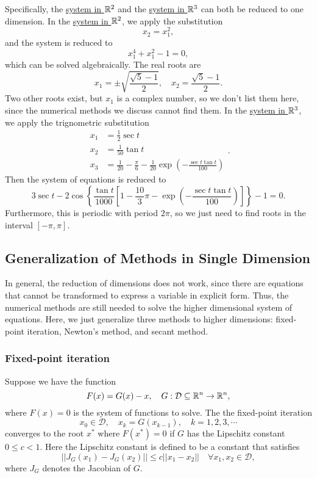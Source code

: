 \begin{table}[H]
Specifically, the \hyperref[eqn1]{system in \(\mathbb{R}^2\)} and the \hyperref[eqn3]{system in \(\mathbb{R}^3\)} can both be reduced to one dimension.
In the \hyperref[eqn1]{system in \(\mathbb{R}^2\)}, we apply the substitution
\[ x_2=x_1^2, \]
and the system is reduced to
\begin{equation}\label{eqn1reduce}
x_1^4+x_1^2-1=0,
\end{equation}
which can be solved algebraically.
The real roots are
\[ x_1=\pm\sqrt{\frac{\sqrt{5}-1}{2}}, \quad x_2=\frac{\sqrt{5}-1}{2}. \]
Two other roots exist, but \(x_1\) is a complex number, so we don't list them here, since the numerical methods we discuss cannot find them.
In the \hyperref[eqn2]{system in \(\mathbb{R}^3\)}, we apply the trignometric substitution
\[ \begin{aligned} x_1&=\frac{1}{2}\sec t \\ x_2&=\frac{1}{50}\tan t\\
x_3&=\frac{1}{20}-\frac{\pi}{6}-\frac{1}{20}\exp\left(-\frac{\sec t\tan t}{100} \right) \end{aligned}. \]
Then the system of equations is reduced to
\begin{equation}\label{eqn2reduce}
3\sec t-2\cos\left\{ \frac{\tan t}{1000} \left[ 1-\frac{10}{3}\pi-\exp\left(-\frac{\sec t\tan t}{100} \right) \right] \right\}-1=0. 
\end{equation}
Furthermore, this is periodic with period \(2\pi\), so we just need to find roots in the interval \([-\pi,\pi]\).

\subsection{Generalization of Methods in Single Dimension}
In general, the reduction of dimensions does not work, since there are equations that cannot be transformed to express a variable in explicit form.
Thus, the numerical methods are still needed to solve the higher dimensional system of equations.
Here, we just generalize three methods to higher dimensions: fixed-point iteration,	Newton's method, and secant method.



\subsubsection{Fixed-point iteration}
Suppose we have the function
\[ F(x)=G(x)-x, \quad G:\mathcal{D}\subseteq\mathbb{R}^{n}\to\mathbb{R}^n, \]
where \(F(x)=0\) is the system of functions to solve.
The the fixed-point iteration
\[ x_0\in\mathcal{D}, \quad x_{k}=G(x_{k-1}), \quad k=1,2,3,\cdots  \]
converges to the root \(x^*\) where \(F(x^*)=0\) if \(G\) has the Lipschitz constant \(0\leq c<1\).
Here the Lipschitz constant is defined to be a constant that satisfies
\[ ||J_G(x_1)-J_G(x_2)|| \leq c ||x_1-x_2|| \quad \forall x_1,x_2\in\mathcal{D}, \]
where \(J_G\) denotes the Jacobian of \(G\).




\end{table}

